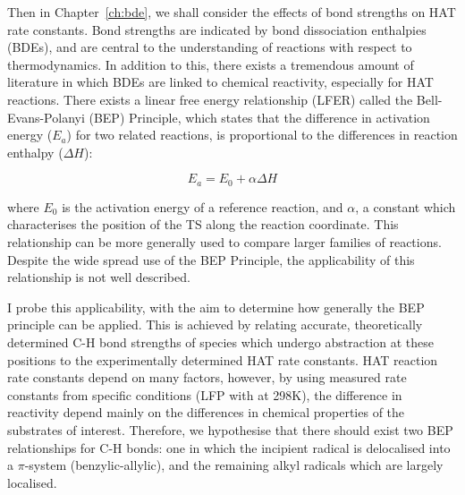 Then in Chapter~\ref{ch:bde}, we shall consider the effects of bond strengths on HAT rate constants. Bond strengths are indicated by bond dissociation enthalpies (BDEs), and are central to the understanding of reactions with respect to thermodynamics. In addition to this, there exists a tremendous amount of literature in which BDEs are linked to chemical reactivity, especially for HAT reactions.\cite{Kochi1973, Tedder1982, Wijtmans2003, Pratt2004, Mayer2004} There exists a linear free energy relationship (LFER) called the Bell-Evans-Polanyi (BEP) Principle,\cite{Bell1936,Evans1938} which states that the difference in activation energy ($E_a$) for two related reactions, is proportional to the differences in reaction enthalpy ($\Delta H$):

\begin{equation}
  E_a = E_0 + \alpha \Delta H
  \label{eq:bep}
\end{equation}

\noindent where $E_0$ is the activation energy of a reference reaction, and $\alpha$, a constant which characterises the position of the TS along the reaction coordinate. This relationship can be more generally used to compare larger families of reactions. Despite the wide spread use of the BEP Principle, the applicability of this relationship is not well described.

I probe this applicability, with the aim to determine how generally the BEP principle can be applied. This is achieved by relating accurate, theoretically determined C-H bond strengths of species which undergo abstraction at these positions to the experimentally determined HAT rate constants. HAT reaction rate constants depend on many factors, however, by using measured rate constants from specific conditions (LFP with \cumo at 298K), the difference in reactivity depend mainly on the differences in chemical properties of the substrates of interest. Therefore, we hypothesise that there should exist two BEP relationships for C-H bonds: one in which the incipient radical is delocalised into a $\pi$-system (benzylic-allylic), and the remaining alkyl radicals which are largely localised.

